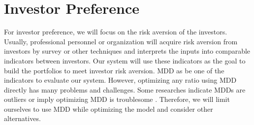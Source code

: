 \section{Investor Preference}
For investor preference, we will focus on the risk aversion of the investors. Usually, professional personnel or organization will acquire risk aversion from investors by survey or other techniques and interprets the inputs into comparable indicators between investors. Our system will use these indicators as the goal to build the portfolios to meet investor risk aversion. MDD as be one of the indicators to evaluate our system. However, optimizing any ratio using MDD directly has many problems and challenges. Some researches indicate MDDs are outliers \cite {johansen2002large, johansen1998stock} or imply optimizing MDD is troublesome \cite{moody1998performance}. Therefore, we will limit ourselves to use MDD while optimizing the model and consider other alternatives. 